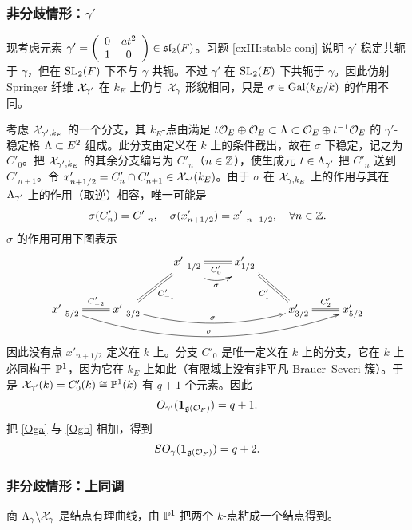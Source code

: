 \subsubsection{非分歧情形：$\gamma'$} 现考虑元素 $\gamma'=\left(\begin{array}{cc} 0 & at^{2} \\ 1 & 0 \end{array}\right)\in\mathfrak{sl}_{2}(F)$。习题 \ref{exIII:stable conj} 说明 $\gamma'$ 稳定共轭于 $\gamma$，但在 $\textup{SL}_{2}(F)$ 下不与 $\gamma$ 共轭。不过 $\gamma'$ 在 $\textup{SL}_{2}(E)$ 下共轭于 $\gamma$。因此仿射 Springer 纤维 $\mathcal{X}_{\gamma'}$ 在 $k_{E}$ 上仍与 $\mathcal{X}_{\gamma}$ 形貌相同，只是 $\sigma\in\textup{Gal}(k_{E}/k)$ 的作用不同。

考虑 $\mathcal{X}_{\gamma',k_{E}}$ 的一个分支，其 $k_{E}$-点由满足 $t\mathcal{O}_{E}\oplus\mathcal{O}_{E}\subset \Lambda\subset \mathcal{O}_{E}\oplus t^{-1}\mathcal{O}_{E}$ 的 $\gamma'$-稳定格 $\Lambda\subset E^{2}$ 组成。此分支由定义在 $k$ 上的条件截出，故在 $\sigma$ 下稳定，记之为 $C'_{0}$。把 $\mathcal{X}_{\gamma',k_{E}}$ 的其余分支编号为 $C'_{n}$（$n\in\mathbb{Z}$），使生成元 $t\in\Lambda_{\gamma'}$ 把 $C'_{n}$ 送到 $C'_{n+1}$。令 $x'_{n+1/2}=C'_{n}\cap C'_{n+1}\in \mathcal{X}_{\gamma'}(k_{E})$。由于 $\sigma$ 在 $\mathcal{X}_{\gamma,k_{E}}$ 上的作用与其在 $\Lambda_{\gamma'}$ 上的作用（取逆）相容，唯一可能是
\begin{equation*}
\sigma(C'_{n})=C'_{-n}, \quad \sigma(x'_{n+1/2})=x'_{-n-1/2},\quad\forall n\in\mathbb{Z}.
\end{equation*}
$\sigma$ 的作用可用下图表示
\begin{equation*}
\xymatrix{ & & x'_{-1/2} \ar@/_{1pc}/@<-1ex>[r]_{\sigma}& x'_{1/2}\\
x'_{-5/2}  \ar@/_2pc/[rrrrr]^{\sigma} 
\ar@{=} '[r]^{C'_{-2}} '[urr]_{C'_{-1}}  '[urrr]_{C'_{0}}  '[rrrr]_{C'_{1}} [rrrrr]^{C'_{2}}
&  x'_{-3/2} \ar@/_{1pc}/[rrr]^{\sigma}& & & x'_{3/2}  & x'_{5/2}}
\end{equation*}
因此没有点 $x'_{n+1/2}$ 定义在 $k$ 上。分支 $C'_{0}$ 是唯一定义在 $k$ 上的分支，它在 $k$ 上必同构于 $\mathbb{P}^{1}$，因为它在 $k_{E}$ 上如此（有限域上没有非平凡 Brauer--Severi 簇）。于是 $\mathcal{X}_{\gamma'}(k)=C'_{0}(k)\cong\mathbb{P}^{1}(k)$ 有 $q+1$ 个元素。因此
\begin{equation}\label{Ogb}
O_{\gamma'}(\mathbf{1}_{\mathfrak{g}(\mathcal{O}_{F})})=q+1.
\end{equation}
把 \eqref{Oga} 与 \eqref{Ogb} 相加，得到
\begin{equation*}
SO_{\gamma}(\mathbf{1}_{\mathfrak{g}(\mathcal{O}_{F})})=q+2.
\end{equation*}

\subsubsection{非分歧情形：上同调} 商 $\Lambda_{\gamma}\backslash\mathcal{X}_{\gamma}$ 是结点有理曲线，由 $\mathbb{P}^{1}$ 把两个 $k$-点粘成一个结点得到。


